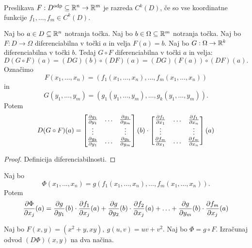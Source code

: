 \begin{definicija}
    Preslikava $F: D^{\text{odp}} \subseteq \mathbb{R}^n \to \mathbb{R}^m$ je razreda $C^k(D)$, če so vse koordinatne funkcije $f_1, \ldots, f_m \in C^k(D)$.
\end{definicija}

\begin{izrek}
    \label{ver-pr}
    Naj bo $a \in D \subseteq \mathbb{R}^n$ notranja točka. Naj bo $b \in \Omega \subseteq \mathbb{R}^m$ notranja točka. Naj bo $F: D \to \Omega$ diferenciabilna v točki $a$ in velja $F(a) = b$. Naj bo $G: \Omega \to \mathbb{R}^k$ diferenciabilna v točki $b$. Tedaj $G \circ F$ diferenciabilna v točki $a$ in velja:
    $$D(G \circ F)(a) = (DG)(b) \circ (DF)(a) = (DG)(F(a)) \circ (DF)(a).$$
    Označimo $$F(x_1, \ldots, x_n) = (f_1(x_1, \ldots, x_n), \ldots, f_m(x_1, \ldots, x_n))$$ in $$G(y_1, \ldots, y_m) = (g_1(y_1, \ldots, y_m), \ldots, g_k(y_1, \ldots, y_m)).$$ Potem 
    $$D(G \circ F)(a) = \begin{bmatrix}
        \frac{\partial g_1}{\partial y_1} & \ldots & \frac{\partial g_1}{\partial y_m} \\
        \vdots & & \vdots \\
        \frac{\partial g_k}{\partial y_1} & \ldots & \frac{\partial g_k}{\partial y_m}
    \end{bmatrix}(b) \cdot \begin{bmatrix}
        \frac{\partial f_1}{\partial x_1} & \ldots & \frac{\partial f_1}{\partial x_n} \\
        \vdots & & \vdots \\
        \frac{\partial f_m}{\partial x_1} & \ldots & \frac{\partial f_m}{\partial x_n}
    \end{bmatrix}(a)$$
\end{izrek}

\begin{proof}
    Definicija diferenciabilnosti.
\end{proof}

\begin{posledica}[$k=1$, $G = g$ funkcija]
    Naj bo $$\Phi(x_1, \ldots, x_n) = g(f_1(x_1, \ldots, x_n), \ldots, f_m(x_1, \ldots, x_n)).$$ Potem 
    $$\frac{\partial \Phi}{\partial x_j}(a) = \frac{\partial g}{\partial y_1}(b) \cdot \frac{\partial f_1}{\partial x_j}(a) + \frac{\partial g}{\partial y_2}(b) \cdot \frac{\partial f_2}{\partial x_j}(a) + \ldots + \frac{\partial g}{\partial y_m}(b) \cdot \frac{\partial f_m}{\partial x_j}(a)$$
\end{posledica}

\begin{zgled}
    Naj bo $F(x,y) = (x^2 + y, xy), \ g(u, v) = uv + v^2$. Naj bo $\Phi = g \circ F$. Izračunaj odvod $(D\Phi)(x,y)$ na dva načina.
\end{zgled}


